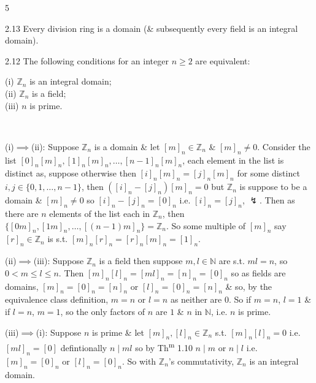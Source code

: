 \documentclass[8pt]{extarticle}
\makeatletter
\renewenvironment{proof}[1][\proofname]{%
  \par\noindent
  \pushQED{\qed}%
  \normalfont\itshape #1\@addpunct{.}\ \normalfont\ignorespaces
}{%
  \popQED%
  \par
}
\makeatother
\begin{document}
\begin{multicols}{5}
        \begin{proposition}{2.13}
            Every division ring is a domain (\& subsequently every field is an integral domain).
        \end{proposition}

        \begin{lemma}{2.12}
            The following conditions for an integer \(n\ge2\) are equivalent:

            (i) \(\mathbb{Z}_n\) is an integral domain;\\
            (ii) \(\mathbb{Z}_n\) is a field;\\
            (iii) \(n\) is prime.
        \end{lemma}

        \begin{proof}
            (i)\(\implies\)(ii):
            Suppose \(\mathbb{Z}_n\) is a domain \& let \([m]_n\in\mathbb{Z}_n\) \& \([m]_n\ne0\). Consider the list \([0]_n[m]_n,[1]_n[m]_n,\ldots,[n-1]_n[m]_n\), each element in the list is distinct as, suppose otherwise then \([i]_n[m]_n=[j]_n[m]_n\) for some distinct \(i,j\in\{0,1,\ldots,n-1\}\), then \(([i]_n-[j]_n)[m]_n=0\) but \(\mathbb{Z}_n\) is suppose to be a domain \& \([m]_n\ne0\) so \([i]_n-[j]_n=[0]_n\) i.e. \([i]_n=[j]_n\), \(\lightning\). Then as there are \(n\) elements of the list each in \(\mathbb{Z}_n\), then \(\{[0m]_n,[1m]_n,\ldots,[(n-1)m]_n\}=\mathbb{Z}_n\). So some multiple of \([m]_n\) say \([r]_n\in\mathbb{Z}_n\) is s.t. \([m]_n[r]_n=[r]_n[m]_n=[1]_n\).

            (ii)\(\implies\)(iii):
            Suppose \(\mathbb{Z}_n\) is a field then suppose \(m,l\in\mathbb{N}\) are s.t. \(ml=n\), so \(0<m\le l\le n\). Then \([m]_n[l]_n=[ml]_n=[n]_n=[0]_n\) so as fields are domains, \([m]_n=[0]_n=[n]_n\) or \([l]_n=[0]_n=[n]_n\) \& so, by the equivalence class definition, \(m=n\) or \(l=n\) as neither are \(0\). So if \(m=n\), \(l=1\) \& if \(l=n\), \(m=1\), so the only factors of \(n\) are \(1\) \& \(n\) in \(\mathbb{N}\), i.e. \(n\) is prime.

            (iii)\(\implies\)(i):
            Suppose \(n\) is prime \& let \([m]_n,[l]_n\in\mathbb{Z}_n\) s.t. \([m]_n[l]_n=0\) i.e. \([ml]_n=[0]\) defintionally \(n\mid ml\) so by Th\textsuperscript{m} 1.10 \(n\mid m\) or \(n\mid l\) i.e. \([m]_n=[0]_n\) or \([l]_n=[0]_n\). So with \(\mathbb{Z}_n\)'s commutativity, \(\mathbb{Z}_n\) is an integral domain.
        \end{proof}


\end{multicols}
\end{document}
